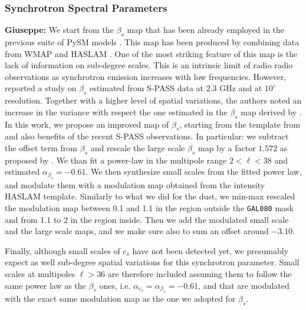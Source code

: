  
\subsubsection{Synchrotron Spectral Parameters}\label{sec:beta_s}
 \textbf{Giuseppe:   } 
 We start from the $\beta_s$ map that has been already employed in the previous suite of PySM models \citet{Thorne:2017}. This map has been produced by combining data from WMAP and HASLAM \citep{mivilledeschenes:2008}. One of the most striking feature of this map is  the lack of information on sub-degree scales. This is an intrinsic limit of radio radio observations as   synchrotron emission  increases  with low frequencies.  However, \citet{Krachmalnicoff:2018} reported a study  on $\beta_s$ estimated from S-PASS data at $2.3 $ GHz and at $10'$ resolution.   Together with a higher level of spatial variations, the authors noted an increase in the variance with respect the one estimated in the $\beta_s$ map derived by \citet{mivilledeschenes:2008}.  In this work, we propose an improved  map of $\beta_s $, starting from the template from \citet{mivilledeschenes:2008} and also benefits of  the recent  S-PASS observations. In particular:  we subtract the offset term from $\beta_s$  and rescale the large scale $\beta_s$   map by a factor $1.572$ as proposed by \citet{Krachmalnicoff:2018}. We than fit a  power-law  in the multipole range  $2<\ell<38$ and estimated $\alpha_{\beta_s}=-0.61 $. We then synthesize  small scales  from the fitted power law,  and modulate them with a modulation map obtained from the intensity HASLAM template. Similarly to what we did for the dust, we  min-max rescaled the modulation map  between 0.1 and 1.1 in the region outside the \texttt{GAL080} mask and from 1.1 to 2 in the region inside. 
 Then we add the modulated small scale  and the  large scale maps, and we make sure also to sum  an offset around $-3.10$.
 
Finally, although small scales of $c_s$  have not been detected yet, we presumably expect as well sub-degree spatial variations for this synchrotron parameter. Small  scales at multipoles $\ell>36$  are therefore  included   assuming them to follow  the same power law as  the $\beta_s$ ones,  i.e. $\alpha _{c_s}=\alpha _{\beta_s} = -0.61$, and that are  modulated with the exact same modulation map as the one we  adopted for $\beta_s$.